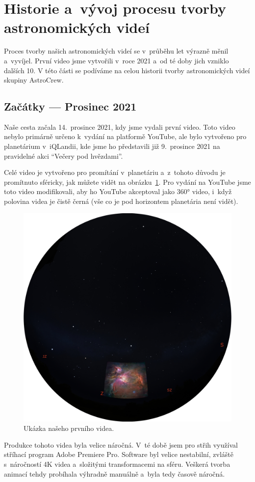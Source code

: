 \documentclass[12pt,a4paper,titlepage]{article}
\begin{document}
\section{Historie a~vývoj procesu tvorby astronomických videí}
Proces tvorby našich astronomických videí se v~průběhu let výrazně měnil a~vyvíjel. První video jsme vytvořili v~roce 2021 a~od té doby jich vzniklo dalších 10. V této části se podíváme na celou historii tvorby astronomických videí skupiny Astro\-Crew.
\subsection{Začátky --- Prosinec 2021}
Naše cesta začala 14.\ prosince 2021, kdy jsme vydali první video. Toto video nebylo primárně určeno k~vydání na platformě YouTube, ale bylo vytvořeno pro planetárium v~iQLandii, kde jsme ho představili již 9.\ prosince 2021 na pravidelné akci \enquote{Večery pod hvězdami}. 

Celé video je vytvořeno pro promítání v~planetáriu a~z~tohoto důvodu je promítnuto sféricky, jak můžete vidět na obrázku~\ref{img:prosinec}. Pro vydání na YouTube jsme toto video modifikovali, aby ho YouTube akceptoval jako 360° video, i~když polovina videa je čistě černá (vše co je pod horizontem planetária není vidět). 

\begin{figure}[H]
	\centering
	\includegraphics[width=.7\textwidth]{prosinec.eps}
	\caption{Ukázka našeho prvního videa.}\label{img:prosinec}
\end{figure}

Produkce tohoto videa byla velice náročná. V~té době jsem pro střih využíval stříhací program Adobe Premiere Pro. Software byl velice nestabilní, zvláště s~náročností 4K videa a~složitými transformacemi na sféru. Veškerá tvorba animací tehdy probíhala výhradně manuálně a~byla tedy časově náročná. 
\end{document}
